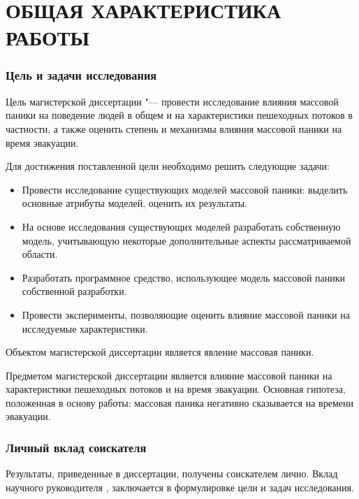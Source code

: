 \chapter*{ОБЩАЯ ХАРАКТЕРИСТИКА РАБОТЫ}

\label{sec:general_characteristics}

\subsection*{\textbf{Цель и задачи исследования}}

Цель магистерской диссертации "--- провести исследование влияния массовой паники на поведение людей в общем
и на характеристики пешеходных потоков в частности, а также оценить степень и механизмы влияния массовой паники
на время эвакуации.

Для достижения поставленной цели необходимо решить следующие задачи:

\begin{itemize}
  \item Провести исследование существующих моделей массовой паники: выделить основные атрибуты моделей, оценить их результаты.
  \item На основе исследования существующих моделей разработать собственную модель, учитывающую некоторые дополнительные аспекты рассматриваемой области.
  \item Разработать программное средство, использующее модель массовой паники собственной разработки.
  \item Провести эксперименты, позволяющие оценить влияние массовой паники на исследуемые характеристики.
\end{itemize}

Объектом магистерской диссертации является явление массовая паники.

Предметом магистерской диссертации является влияние массовой паники на характеристики пешеходных потоков и на время эвакуации.
Основная гипотеза, положенная в основу работы: массовая паника негативно сказывается на времени эвакуации.

\subsection*{\textbf{Личный вклад соискателя}}

Результаты, приведенные в диссертации, получены соискателем лично.
Вклад научного руководителя \mastersCharSupervisor, заключается в формулировке цели и задач исследования.


